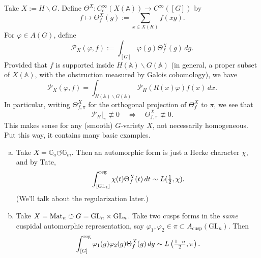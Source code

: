 \documentclass[reqno]{amsart} 
\numberwithin{theorem}{section}
\numberwithin{equation}{section}
\numberwithin{exercise}{section}
\begin{document}
Take $X := H \backslash G$.  Define $\Theta^X : C_c^\infty(X(\mathbb{A})) \rightarrow C^\infty([G])$ by
\begin{equation*}
  f \mapsto \Theta_f^X(g) := \sum_{x \in X(K)} f(x g).
\end{equation*}
For $\varphi \in A(G)$, define
\begin{equation*}
  \mathcal{P}_X(\varphi, f) := \int_{[G]}
  \varphi(g) \Theta_f^X(g) \, d g.
\end{equation*}
Provided that $f$ is supported inside $H(\mathbb{A}) \backslash G(\mathbb{A})$ (in general, a proper subset of $X(\mathbb{A})$, with the obstruction measured by Galois cohomology), we have
\begin{equation*}
  \mathcal{P}_X(\varphi, f) = \int_{H(\mathbb{A}) \backslash G(\mathbb{A})}
  \mathcal{P}_H(R(x) \varphi) f(x) \, d x.
\end{equation*}
In particular, writing $\Theta_{f,\pi}^X$ for the orthogonal projection of $\Theta_{f}^X$ to $\pi$, we see that
\begin{equation*}
  \mathcal{P}_H |_\pi \not \equiv 0
  \quad \iff \quad
  \Theta_{f,\pi}^X  \not \equiv 0.
\end{equation*}
This makes sense for any (smooth) $G$-variety $X$, not necessarily homogeneous.  Put this way, it contains many basic examples.
\begin{example}\label{example:cq6thpw9ml}
  \begin{enumerate}[(a)]
  \item\label{enumerate:cq6thpxd02} Take $X = \mathbb{G}_a \circlearrowleft \mathbb{G}_m$.  Then an automorphic form is just a Hecke character $\chi$, and by Tate,
    \begin{equation*}
      \int_{[\mathrm{GL}_1]}^{\operatorname{reg}} \chi(t) \Theta_f^X(t) \, d t \sim L(\tfrac{1}{2}, \chi).
    \end{equation*}
    (We'll talk about the regularization later.)
  \item\label{enumerate:cq6thpxe24} Take $X = \operatorname{Mat}_n \circlearrowleft G = \mathrm{GL}_n \times \mathrm{GL}_n$.  Take two cusps forms in the \emph{same} cuspidal automorphic representation, say $\varphi_1, \varphi_2 \in \pi \subset A_{\mathrm{cusp}}(\mathrm{GL}_n)$.  Then
    \begin{equation*}
      \int_{[G]}^{\operatorname{reg}} \varphi_1(g) \varphi_2(g) \Theta_f^X(g) \, d g \sim L \left( \tfrac{1 - n}{2}, \pi \right).
    \end{equation*}
  \end{enumerate}
\end{example}
\end{document}
